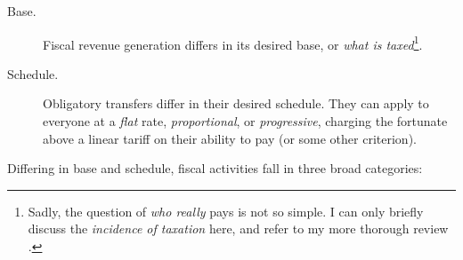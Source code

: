 \begin{description}
	\item[Base.]  \label{it:base} Fiscal revenue generation differs in its desired base, or \emph{what is taxed}\footnote{
		Sadly, the question of \emph{who really} pays is not so simple. I can only briefly discuss the \emph{incidence of taxation} here, and refer to my more thorough review \citep{Held2010a}.}.
	\item[Schedule.]  \label{it:schedule} Obligatory transfers differ in their desired schedule. They can apply to everyone at a \emph{flat} rate, \emph{proportional}, or \emph{progressive}, charging the fortunate above a linear tariff on their ability to pay (or some other criterion). 
\end{description}

 

Differing in base and schedule, fiscal activities fall in three broad categories:

